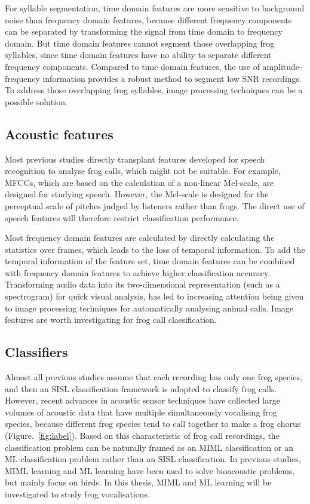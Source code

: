 For syllable segmentation, time domain features are more sensitive to background noise than frequency domain features, because different frequency components can be separated by transforming the signal from time domain to frequency domain. But time domain features cannot segment those overlapping frog syllables, since time domain features have no ability to separate different frequency components. Compared to time domain features, the use of amplitude-frequency information provides a robust method to segment low SNR recordings. To address those overlapping frog syllables, image processing techniques can be a possible solution. 




\subsection{Acoustic features}
Most previous studies directly transplant features developed for speech recognition to analyse frog calls, which might not be suitable. For example, MFCCs, which are based on the calculation of a non-linear Mel-scale, are designed for studying speech. However, the Mel-scale is designed for the perceptual scale of pitches judged by listeners rather than frogs. The direct use of speech features will therefore restrict classification performance. 

Most frequency domain features are calculated by directly calculating the statistics over frames, which leads to the loss of temporal information. To add the temporal information of the feature set, time domain features can be combined with frequency domain features to achieve higher classification accuracy. Transforming audio data into its two-dimensional representation (such as a spectrogram) for quick visual analysis, has led to increasing attention being given to image processing techniques for automatically analysing animal calls. Image features are worth investigating for frog call classification.

\subsection{Classifiers}
Almost all previous studies assume that each recording has only one frog species, and then an SISL classification framework is adopted to classify frog calls. However, recent advances in acoustic sensor techniques have collected large volumes of acoustic data that have multiple simultaneously vocalising frog species, because different frog species tend to call together to make a frog chorus (Figure.~\ref{fig:label}). Based on this characteristic of frog call recordings, the classification problem can be naturally framed as an MIML classification or an ML classification problem rather than an SISL classification.
In previous studies, MIML learning and ML learning have been used to solve bioacoustic problems, but mainly focus on birds. In this thesis, MIML and ML learning will be investigated to study frog vocalisations.





